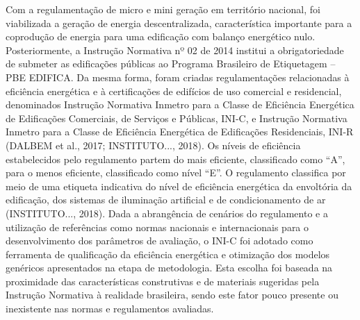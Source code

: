 \begin{onehalfspace}
Com a regulamentação de micro e mini geração em território nacional, foi viabilizada a geração de 
energia descentralizada, característica importante para a coprodução de energia para uma edificação 
com balanço energético nulo.\vspace{0.3cm} \newline
Posteriormente, a Instrução Normativa nº 02 de 2014 institui a obrigatoriedade de submeter as edificações 
públicas ao Programa Brasileiro de Etiquetagem – PBE EDIFICA. Da mesma forma, foram criadas regulamentações 
relacionadas à eficiência energética e à certificações de edifícios de uso comercial e residencial, 
denominados Instrução Normativa Inmetro para a Classe de Eficiência Energética de Edificações Comerciais, 
de Serviços e Públicas, INI-C, e Instrução Normativa Inmetro para a Classe de Eficiência Energética 
de Edificações Residenciais, INI-R (DALBEM et al., 2017; INSTITUTO..., 2018).\vspace{0.3cm} \newline
Os níveis de eficiência estabelecidos pelo regulamento partem do mais eficiente, classificado como 
“A”, para o menos eficiente, classificado como nível “E”. O regulamento classifica por meio de uma 
etiqueta indicativa do nível de eficiência energética da envoltória da edificação, dos sistemas de 
iluminação artificial e de condicionamento de ar (INSTITUTO..., 2018).\vspace{0.3cm} \newline
Dada a abrangência de cenários do regulamento e a utilização de referências como normas nacionais 
e internacionais para o desenvolvimento dos parâmetros de avaliação, o INI-C foi adotado como 
ferramenta de qualificação da eficiência energética e otimização dos modelos genéricos apresentados 
na etapa de metodologia. Esta escolha foi baseada na proximidade das características construtivas 
e de materiais sugeridas pela Instrução Normativa à realidade brasileira, sendo este fator pouco 
presente ou inexistente nas normas e regulamentos avaliadas.
\end{onehalfspace}